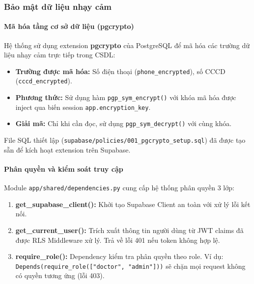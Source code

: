 \documentclass[a4paper,12pt]{article}
\begin{document}
\subsubsection{Bảo mật dữ liệu nhạy cảm}

\paragraph{Mã hóa tầng cơ sở dữ liệu (pgcrypto)}

Hệ thống sử dụng extension \textbf{pgcrypto} của PostgreSQL để mã hóa các trường dữ liệu nhạy cảm trực tiếp trong CSDL:

\begin{itemize}
    \item \textbf{Trường được mã hóa:} Số điện thoại (\texttt{phone\_encrypted}), số CCCD (\texttt{cccd\_encrypted}).
    \item \textbf{Phương thức:} Sử dụng hàm \texttt{pgp\_sym\_encrypt()} với khóa mã hóa được inject qua biến session \texttt{app.encryption\_key}.
    \item \textbf{Giải mã:} Chỉ khi cần đọc, sử dụng \texttt{pgp\_sym\_decrypt()} với cùng khóa.
\end{itemize}

File SQL thiết lập (\texttt{supabase/policies/001\_pgcrypto\_setup.sql}) đã được tạo sẵn để kích hoạt extension trên Supabase.

\paragraph{Phân quyền và kiểm soát truy cập}

Module \texttt{app/shared/dependencies.py} cung cấp hệ thống phân quyền 3 lớp:

\begin{enumerate}
    \item \textbf{get\_supabase\_client():} Khởi tạo Supabase Client an toàn với xử lý lỗi kết nối.
    \item \textbf{get\_current\_user():} Trích xuất thông tin người dùng từ JWT claims đã được RLS Middleware xử lý. Trả về lỗi 401 nếu token không hợp lệ.
    \item \textbf{require\_role():} Dependency kiểm tra phân quyền theo role. Ví dụ: \texttt{Depends(require\_role(["doctor", "admin"]))} sẽ chặn mọi request không có quyền tương ứng (lỗi 403).
\end{enumerate}
\end{document}
